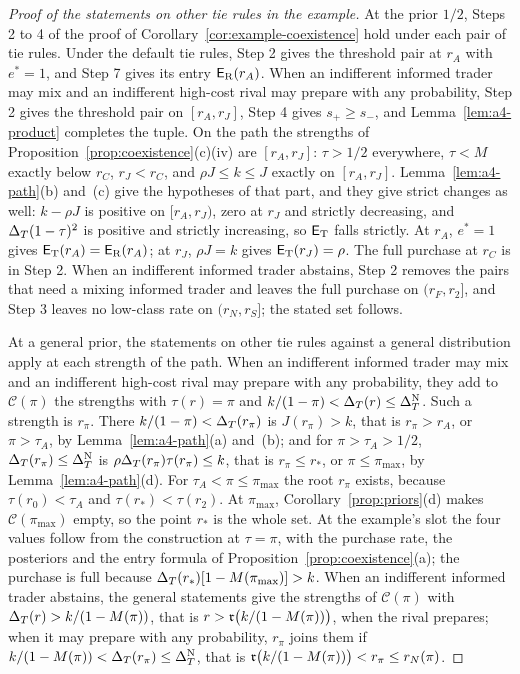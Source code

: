 \begin{proof}[Proof of the statements on other tie rules in the example]
At the prior \(1/2\), Steps 2 to 4 of the proof of Corollary~\ref{cor:example-coexistence} hold under each pair of tie
rules. Under the default tie rules, Step 2 gives the threshold pair at \(r_A\) with \(e^*=1\), and Step 7 gives its
entry \(\mathsf{E}_{\rm R}(r_A)\). When an indifferent informed trader may mix and an indifferent high-cost rival may prepare
with any probability, Step 2 gives the threshold pair on \([r_A,r_J]\), Step 4 gives \(s_+\ge s_-\), and
Lemma~\ref{lem:a4-product} completes the tuple. On the path the strengths of Proposition~\ref{prop:coexistence}(c)(iv)
are \([r_A,r_J]\): \(\tau>1/2\) everywhere, \(\tau<M\) exactly below \(r_C\), \(r_J<r_C\), and \(\rho J\le k\le J\) exactly
on \([r_A,r_J]\). Lemma~\ref{lem:a4-path}(b) and~(c) give the hypotheses of that part, and they give strict changes as
well: \(k-\rho J\) is positive on \([r_A,r_J)\), zero at \(r_J\) and strictly decreasing, and \(\Delta_T(1-\tau)^2\) is positive
and strictly increasing, so \(\mathsf{E}_{\rm T}\) falls strictly. At \(r_A\), \(e^*=1\) gives \(\mathsf{E}_{\rm T}(r_A)=\mathsf{E}_{\rm R}(r_A)\);
at \(r_J\), \(\rho J=k\) gives \(\mathsf{E}_{\rm T}(r_J)=\rho\). The full purchase at \(r_C\) is in Step 2. When an indifferent
informed trader abstains, Step 2 removes the pairs that need a mixing informed trader and leaves the full purchase on
\((r_F,r_2]\), and Step 3 leaves no low-class rate on \((r_N,r_S]\); the stated set follows.

At a general prior, the statements on other tie rules against a general distribution apply at each strength of the path. When
an indifferent informed trader may mix and an indifferent high-cost rival may prepare with any probability, they add to
\(\mathcal C(\pi)\) the strengths with \(\tau(r)=\pi\) and \(k/(1-\pi)<\Delta_T(r)\le\Delta_T^{\rm N}\). Such a strength is \(r_\pi\).
There \(k/(1-\pi)<\Delta_T(r_\pi)\) is \(J(r_\pi)>k\), that is \(r_\pi>r_A\), or \(\pi>\tau_A\), by Lemma~\ref{lem:a4-path}(a)
and~(b); and for \(\pi>\tau_A>1/2\), \(\Delta_T(r_\pi)\le\Delta_T^{\rm N}\) is \(\rho\Delta_T(r_\pi)\tau(r_\pi)\le k\), that is
\(r_\pi\le r_*\), or \(\pi\le\pi_{\max}\), by Lemma~\ref{lem:a4-path}(d). For \(\tau_A<\pi\le\pi_{\max}\) the root
\(r_\pi\) exists, because \(\tau(r_0)<\tau_A\) and \(\tau(r_*)<\tau(r_2)\). At \(\pi_{\max}\), Corollary~\ref{prop:priors}(d)
makes \(\mathcal C(\pi_{\max})\) empty, so the point \(r_*\) is the whole set. At the example's slot the four values
follow from the construction at \(\tau=\pi\), with the purchase rate, the posteriors and the entry formula of
Proposition~\ref{prop:coexistence}(a); the purchase is full because \(\Delta_T(r_*)[1-M(\pi_{\max})]>k\). When an
indifferent informed trader abstains, the general statements give the strengths of \(\mathcal C(\pi)\) with
\(\Delta_T(r)>k/(1-M(\pi))\), that is \(r>\mathfrak{r}\bigl(k/(1-M(\pi))\bigr)\), when the rival prepares; when it may prepare
with any probability, \(r_\pi\) joins them if \(k/(1-M(\pi))<\Delta_T(r_\pi)\le\Delta_T^{\rm N}\), that is
\(\mathfrak{r}\bigl(k/(1-M(\pi))\bigr)<r_\pi\le r_N(\pi)\).
\end{proof}


